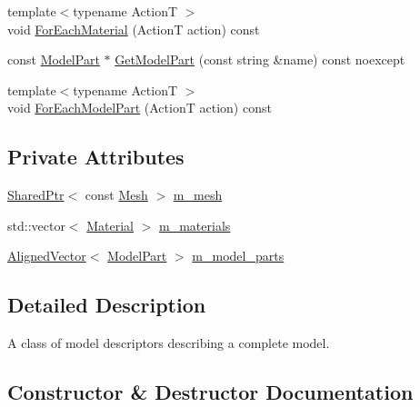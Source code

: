 \begin{DoxyCompactItemize}
\item 
{\footnotesize template$<$typename ActionT $>$ }\\void \hyperlink{classmage_1_1rendering_1_1_model_descriptor_adb6b348af57fed57e36b094a1dc59cd0}{For\+Each\+Material} (ActionT action) const
\item 
const \hyperlink{structmage_1_1rendering_1_1_model_part}{Model\+Part} $\ast$ \hyperlink{classmage_1_1rendering_1_1_model_descriptor_a451867513276357536075085edf88592}{Get\+Model\+Part} (const string \&name) const noexcept
\item 
{\footnotesize template$<$typename ActionT $>$ }\\void \hyperlink{classmage_1_1rendering_1_1_model_descriptor_a7a1beb3e9aafcb4437d619ac8ca7d385}{For\+Each\+Model\+Part} (ActionT action) const
\end{DoxyCompactItemize}
\subsection*{Private Attributes}
\begin{DoxyCompactItemize}
\item 
\hyperlink{namespacemage_a1e01ae66713838a7a67d30e44c67703e}{Shared\+Ptr}$<$ const \hyperlink{classmage_1_1rendering_1_1_mesh}{Mesh} $>$ \hyperlink{classmage_1_1rendering_1_1_model_descriptor_a18fd5970f038726fd200e60f3c5ad33e}{m\+\_\+mesh}
\item 
std\+::vector$<$ \hyperlink{classmage_1_1rendering_1_1_material}{Material} $>$ \hyperlink{classmage_1_1rendering_1_1_model_descriptor_ae88269763478f47e5d6c0086a4aeb33b}{m\+\_\+materials}
\item 
\hyperlink{namespacemage_a8664bfb5ce2179fc64eae9f82c8a5ba8}{Aligned\+Vector}$<$ \hyperlink{structmage_1_1rendering_1_1_model_part}{Model\+Part} $>$ \hyperlink{classmage_1_1rendering_1_1_model_descriptor_a2c2eda62e6f2c7f6274a0f829b6abfa1}{m\+\_\+model\+\_\+parts}
\end{DoxyCompactItemize}


\subsection{Detailed Description}
A class of model descriptors describing a complete model. 

\subsection{Constructor \& Destructor Documentation}
\hypertarget{classmage_1_1rendering_1_1_model_descriptor_aa27c73a72219352647cd31ddfd6e64d6}{}\label{classmage_1_1rendering_1_1_model_descriptor_aa27c73a72219352647cd31ddfd6e64d6} 
